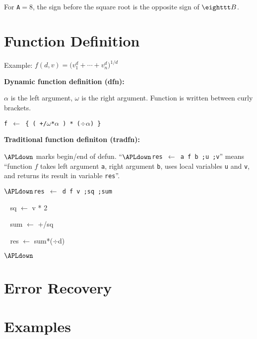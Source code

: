 For {\tt A}$=8$, the sign before the square root is the opposite sign of $\tt B$.

\section{Function Definition}

Example:
$f(d,v) = {\big(v_1^d+\cdots+v_n^d\big)^{1/d}}$

{\bf Dynamic function definition (dfn):}

$\alpha$ is the left argument, $\omega$ is the right argument.
Function is written between curly brackets.

{\tt f $\leftarrow$ \{ ( +/$\omega$*$\alpha$ ) * ($\div\alpha$)  \}}

{\bf Traditional function definiton (tradfn):}

$\APLdown$ marks begin/end of defun.
``{\tt $\APLdown$res $\leftarrow$ a f b ;u ;v}'' means
``function $f$ takes left argument {\tt a},
right argument {\tt b}, uses local variables {\tt u}
and {\tt v}, and returns its result in variable {\tt res}''.

{\tt $\APLdown$res $\leftarrow$ d f v ;sq ;sum

$\;\;$  sq $\leftarrow$ v * 2

$\;\;$  sum $\leftarrow$ +/sq

$\;\;$  res $\leftarrow$ sum*($\div$d)

$\APLdown$}

\section{Error Recovery}


\section{Examples}


\copyrightnotice

\bye

